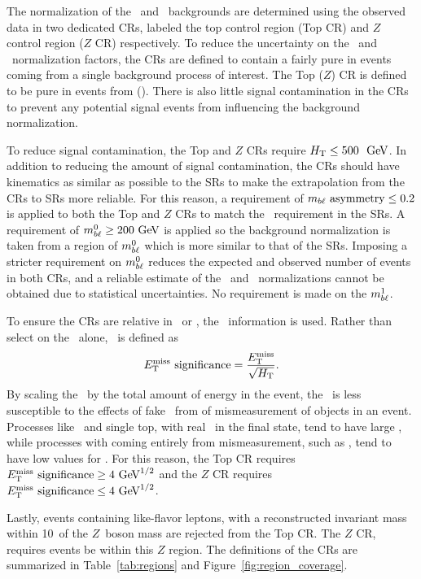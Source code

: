 The normalization of the \TTBAR\ and \ZGAMMAJETS\ backgrounds are determined
using the observed data in two dedicated CRs, labeled the top control region
(Top CR) and $Z$ control region ($Z$ CR) respectively.
To reduce the uncertainty on the \TTBAR\ and \ZGAMMAJETS\ normalization factors,
the CRs are defined to contain a fairly pure in events coming from a single
background process of interest.
The Top ($Z$) CR is defined to be pure in events from \TTBAR (\ZGAMMAJETS).
There is also little signal contamination in the CRs to prevent any potential
signal events from influencing the background normalization.

To reduce signal contamination, the Top and $Z$ CRs require $\HT \leq 500~\GeV$.
In addition to reducing the amount of signal contamination, the CRs should have
kinematics as similar as possible to the SRs to make the extrapolation from the
CRs to SRs more reliable.
For this reason, a requirement of $m_{b\ell}~\mathrm{asymmetry} \leq 0.2$ is applied to both the
Top and $Z$ CRs to match the \MBLASYM\ requirement in the SRs.
A requirement of $\MBL^0 \geq 200 \GeV$ is applied so the background
normalization is taken from a region of $m_{b\ell}^0$ which is more similar to that
of the SRs.
Imposing a stricter requirement on $m_{b\ell}^0$ reduces the expected and observed
number of events in both CRs, and a reliable estimate of the \TTBAR\ and
\ZGAMMAJETS\ normalizations cannot be obtained due to statistical uncertainties.
No requirement is made on the $m_{b\ell}^1$.

To ensure the CRs are relative in \TTBAR\ or \ZGAMMAJETS, the \MET\ information
is used.
Rather than select on the \MET\ alone, \METSIG\ is defined as
\begin{equation}
  E_{\mathrm{T}}^{\mathrm{miss}}~\text{significance} = \frac{E_{\mathrm{T}}^{\mathrm{miss}}}{\sqrt{H_{\mathrm{T}}}}.
\end{equation}
By scaling the \MET\ by the total amount of energy in the event, the
\METSIG\ is less susceptible to the effects of fake \MET\ from of mismeasurement
of objects in an event.
Processes like \TTBAR\ and single top, with real \MET\ in the final state, tend
to have large \METSIG, while processes with \MET coming entirely from
mismeasurement, such as \ZGAMMAJETS, tend to have low values for \METSIG.
For this reason, the Top CR requires $\METSIG \geq 4 \GeV^{1/2}$
and the $Z$ CR requires $\METSIG \leq 4 \GeV^{1/2}$.

Lastly, events containing like-flavor leptons, with a reconstructed invariant
mass within 10~\GeV of the $Z$~boson mass are rejected from the Top CR.
The $Z$ CR, requires events be within this $Z$ region.
The definitions of the CRs are summarized in Table~\ref{tab:regions} and
Figure~\ref{fig:region_coverage}.

